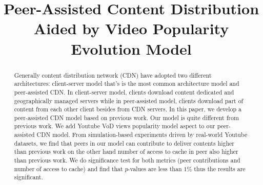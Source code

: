 \documentclass[10pt,final,journal,a4paper]{IEEEtran}
\begin{document}
%
\title{Peer-Assisted Content Distribution Aided by Video Popularity Evolution Model}

\author{
 \quad
{}
}








\maketitle


\begin{abstract}
Generally content distribution network (CDN) have adopted two different architectures: client-server model that's is the most common architecture model and peer-assisted CDN.  
In client-server model, clients download content dedicated and geographically managed servers while in peer-assisted model, clients download part of content from each other client besides from CDN servers. 
In this paper, we develop a peer-assisted CDN model based on previous work. 
Our model is quite different from previous work.  
We add Youtube VoD views popularity model aspect to our peer-assisted CDN model. 
From simulation-based experiments driven by real-world Youtube datasets, we find that peers in our model can contribute to deliver contents higher than previous work on the other hand number of access to cache in peer also higher than previous work.
We do significance test for both metrics (peer contributions and number of access to cache) and find that $p$-values are less than $1$\% thus the results are significant.

\end{abstract}
\end{document}

